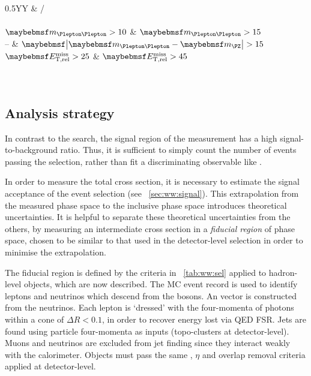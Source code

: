 \begin{description}
	\begin{table}[b]
		\begin{tabularx}{0.5\textwidth}{YY}
			\toprule
			\emch & \eech/\mmch \\
			\midrule
			 \\
			$\mll > 10$    & $\mll > 15$ \\
			--             & $\mods{\mll - \mZ} > 15$ \\
			$\metrel > 25$ & $\metrel > 45$ \\
			 \\
			 \\
			\bottomrule
		\end{tabularx}
		\caption{Summary of \WW event selection. Cuts are given in \GeV. The relevant observables are described in \Chapter~\ref{chap:selection}.}
		\label{tab:ww:sel}
	\end{table}

\end{description}



\subsection{Analysis strategy}

In contrast to the \HWW search, the signal region of the \WW measurement has a high 
signal-to-background ratio. Thus, it is sufficient to simply count the number of events 
passing the selection, rather than fit a discriminating observable like \mt.

In order to measure the total \WW cross section, it is necessary to estimate the signal 
acceptance of the event selection (see \Section~\ref{sec:ww:signal}). This extrapolation 
from the measured phase space to the inclusive phase space introduces theoretical 
uncertainties. It is helpful to separate these theoretical uncertainties from the others, 
by measuring an intermediate cross section in a \textit{fiducial region} of phase space, 
chosen to be similar to that used in the detector-level selection in order to minimise 
the extrapolation.

The fiducial region is defined by the criteria in \Table~\ref{tab:ww:sel} applied to 
hadron-level objects, which are now described. The MC event record is used to identify 
leptons and neutrinos which descend from the \PW bosons. An \metvec vector is constructed 
from the neutrinos. Each lepton is `dressed' with the four-momenta of photons within a 
cone of $\Delta R < 0.1$, in order to recover energy lost via QED FSR. Jets are found 
using particle four-momenta as inputs (\cf topo-clusters at detector-level). Muons and 
neutrinos are excluded from jet finding since they interact weakly with the calorimeter. 
Objects must pass the same \pt, $\eta$ and overlap removal criteria applied at 
detector-level.

